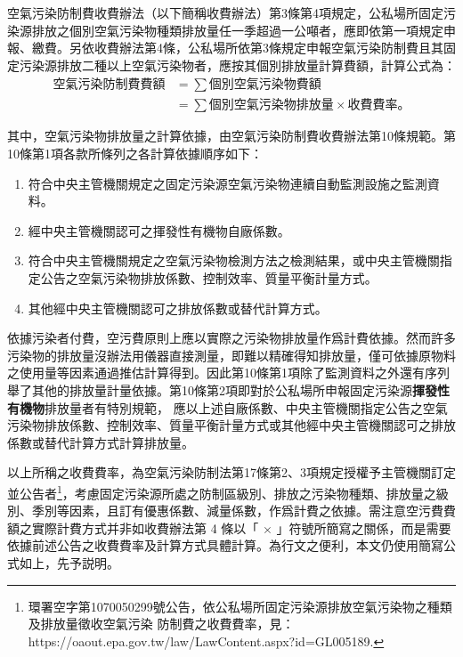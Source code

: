 空氣污染防制費收費辦法（以下簡稱收費辦法）第3條第4項規定，公私場所固定污染源排放之個別空氣污染物種類排放量任一季超過一公噸者，應即依第一項規定申報、繳費。另依收費辦法第4條，公私場所依第3條規定申報空氣污染防制費且其固定污染源排放二種以上空氣污染物者，應按其個別排放量計算費額，計算公式為：
\begin{equation*}
   \begin{aligned}
     \text{空氣污染防制費費額}&=\sum \text{個別空氣污染物費額}\\
     &=\sum\text{個別空氣污染物排放量}\times \text{收費費率。}
   \end{aligned}
 \end{equation*}


其中，空氣污染物排放量之計算依據，由空氣污染防制費收費辦法第10條規範。第10條第1項各款所條列之各計算依據順序如下：

\begin{enumerate}[itemsep=0em]
   \item 符合中央主管機關規定之固定污染源空氣污染物連續自動監測設施之監測資料。
   \item 經中央主管機關認可之揮發性有機物自廠係數。
   \item 符合中央主管機關規定之空氣污染物檢測方法之檢測結果，或中央主管機關指定公告之空氣污染物排放係數、控制效率、質量平衡計量方式。
   \item 其他經中央主管機關認可之排放係數或替代計算方式。
\end{enumerate}

依據污染者付費，空污費原則上應以實際之污染物排放量作爲計費依據。然而許多污染物的排放量沒辦法用儀器直接測量，即難以精確得知排放量，僅可依據原物料之使用量等因素通過推估計算得到。因此第10條第1項除了監測資料之外還有序列舉了其他的排放量計量依據。第10條第2項即對於公私場所申報固定污染源\textbf{揮發性有機物}排放量者有特別規範，
應以上述自廠係數、中央主管機關指定公告之空氣污染物排放係數、控制效率、質量平衡計量方式或其他經中央主管機關認可之排放係數或替代計算方式計算排放量。

以上所稱之收費費率，為空氣污染防制法第17條第2、3項規定授權予主管機關訂定並公告者\footnote{環署空字第1070050299號公告，依公私場所固定污染源排放空氣污染物之種類及排放量徵收空氣污染
防制費之收費費率，見：https://oaout.epa.gov.tw/law/LawContent.aspx?id=GL005189.}，考慮固定污染源所處之防制區級別、排放之污染物種類、排放量之級別、季別等因素，且訂有優惠係數、減量係數，作爲計費之依據。需注意空污費費額之實際計費方式并非如收費辦法第 4 條以「 $\times$ 」符號所簡寫之關係，而是需要依據前述公告之收費費率及計算方式具體計算。為行文之便利，本文仍使用簡寫公式如上，先予説明。



